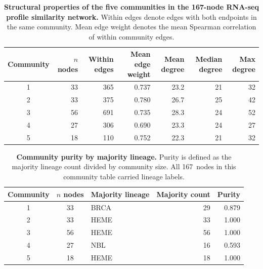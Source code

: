 \begin{table}[H]
\centering
\caption{\textbf{Structural properties of the five communities in the 167-node
  RNA-seq profile similarity network.} Within edges denote edges with
  both endpoints in the same community. Mean edge weight denotes the mean
  Spearman correlation of within community edges.}
\label{tab:summary}
\begin{tabular}{crrrrrr}
\toprule
Community & $n$ nodes & Within edges & Mean edge weight &
  Mean degree & Median degree & Max degree \\
\midrule
1 & 33 & 365 & 0.737 & 23.2 & 21 & 32 \\
2 & 33 & 375 & 0.780 & 26.7 & 25 & 42 \\
3 & 56 & 691 & 0.735 & 28.3 & 24 & 52 \\
4 & 27 & 306 & 0.690 & 23.3 & 24 & 27 \\
5 & 18 & 110 & 0.752 & 22.3 & 21 & 32 \\
\bottomrule
\end{tabular}
\end{table}

\begin{table}[H]
\centering
\caption{\textbf{Community purity by majority lineage.} Purity is defined as
  the majority lineage count divided by community size. All 167~nodes in
  this community table carried lineage labels.}
\label{tab:purity}
\begin{tabular}{cclrr}
\toprule
Community & $n$ nodes & Majority lineage & Majority count & Purity \\
\midrule
1 & 33 & BRCA & 29 & 0.879 \\
2 & 33 & HEME & 33 & 1.000 \\
3 & 56 & HEME & 56 & 1.000 \\
4 & 27 & NBL  & 16 & 0.593 \\
5 & 18 & HEME & 18 & 1.000 \\
\bottomrule
\end{tabular}
\end{table}

